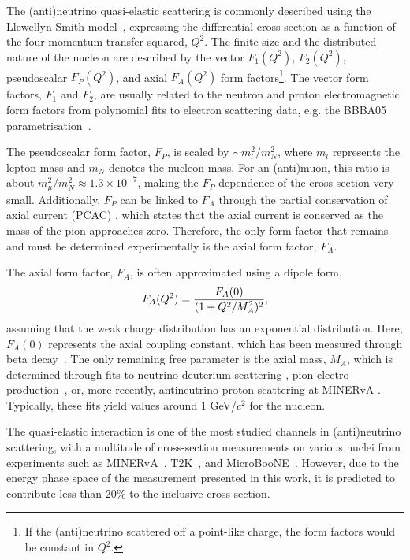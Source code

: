 The (anti)neutrino quasi-elastic scattering is commonly described using the Llewellyn Smith mo\-del~\cite{LLEWELLYNSMITH1972261}, expressing the differential cross-section as a function of the four-momentum transfer squared, $Q^2$. The finite size and the distributed nature of the nucleon are described by the vector $F_1 (Q^2)$, $F_2(Q^2)$, pseudoscalar $F_P(Q^2)$, and axial $F_A (Q^2)$ form factors\footnote{If the (anti)neutrino scattered off a point-like charge, the form factors would be constant in $Q^2$.}. The vector form factors, $F_1$ and $F_2$, are usually related to the neutron and proton electromagnetic form factors from polynomial fits to electron scattering data, e.g. the BBBA05 parametrisation~\cite{BRADFORD2006127}. 

The pseudoscalar form factor, $F_P$, is scaled by $\sim m_l^2/m_N^2$, where $m_l$ represents the lepton mass and $m_N$ denotes the nucleon mass. For an (anti)muon, this ratio is about $m_{\mu}^2/m_N^2 \approx 1.3 \times 10^{-7}$, making the $F_P$ dependence of the cross-section very small. Additionally, $F_P$ can be linked to $F_A$ through the partial conservation of axial current (PCAC) \cite{PhysRev.135.B963}, which states that the axial current is conserved as the mass of the pion approaches zero. Therefore, the only form factor that remains and must be determined experimentally is the axial form factor, $F_A$.

The axial form factor, $F_A$, is often approximated using a dipole form,\enlargethispage{0.5\baselineskip}
\vspace{-10pt}
\begin{equation}
    F_A(Q^2) = \frac{F_A(0)}{(1+Q^2/M_A^2)^2},
    \vspace{-10pt}
    \label{eq:formFactor}
\end{equation} %
assuming that the weak charge distribution has an exponential distribution. Here, $F_A(0)$ represents the axial coupling constant, which has been measured through beta decay~\cite{Wilkinson:1982hu}. The only remaining free parameter is the axial mass, $M_A$, which is determined through fits to neutrino-deuterium scattering \cite{PhysRevD.16.3103, Ahrens:1988rr, Bodek_2008}, pion electro-\mbox{produc\-tion~\cite{PhysRevLett.71.3927, Bernard_2001}}, or, more recently, antineutrino-proton scattering at MINERvA \cite{MINERvANature}. Typically, these fits yield values around 1 GeV/$c^2$ for the nucleon.

The quasi-elastic interaction is one of the most studied channels in (anti)neutrino scattering, with a multitude of cross-section measurements on various nuclei from experiments such as MINERvA~\cite{PhysRevLett.124.121801, PhysRevD.108.032018,KleykampCCQE_PhysRevLett.130.161801}, T2K~\cite{PhysRevD.91.112002, PhysRevD.108.112009}, and MicroBooNE~\cite{PhysRevLett.125.201803}. However, due to the energy phase space of the measurement presented in this work, it is predicted to contribute less than 20\% to the inclusive cross-section.



